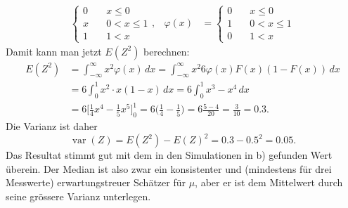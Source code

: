 \begin{loesung}
\begin{teilaufgaben}
\begin{align*}
\begin{cases}
0&\quad x \le 0\\
x&\quad 0<x\le1\\
1&\quad 1 < x
\end{cases},
&
\varphi(x)
&=\begin{cases}
0&\quad x \le 0\\
1&\quad 0<x\le1\\
0&\quad 1 < x
\end{cases}
\end{align*}
Damit kann man jetzt $E(Z^2)$ berechnen:
\begin{align*}
E(Z^2)&=\int_{-\infty}^{\infty}x^2 \varphi(x)\,dx=\int_{-\infty}^{\infty}
x^2
6\varphi(x)F(x)(1-F(x))
\,dx
\\
&=6\int_0^1x^2\cdot x(1-x)\,dx=6\int_0^1x^3-x^4\,dx\\
&=
6\biggl[
\frac14x^4-\frac15x^5
\biggr]_0^1=6\biggl(\frac14-\frac15\biggr)=6\frac{5-4}{20}=\frac3{10}=0.3.
\end{align*}
Die Varianz ist daher
\[
\operatorname{var}(Z)=E(Z^2)-E(Z)^2=0.3 - 0.5^2=0.05.
\]
Das Resultat stimmt gut mit dem in den Simulationen in b) gefunden Wert
überein. Der Median ist also zwar ein konsistenter und (mindestens für
drei Messwerte) erwartungstreuer Schätzer für $\mu$, aber er ist
dem Mittelwert durch seine grössere Varianz unterlegen.
\qedhere
\end{teilaufgaben}
\end{loesung}

